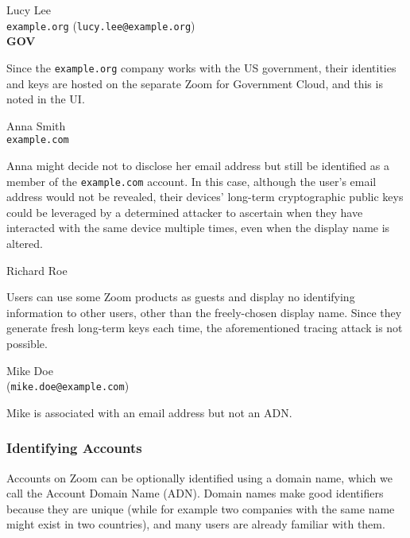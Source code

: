 \begin{multicols}{2}
Lucy Lee \\
\texttt{example.org} (\texttt{lucy.lee@example.org}) \\ \textbf{GOV}

\columnbreak

Since the \texttt{example.org} company works with the US government, their identities and keys are
hosted on the separate Zoom for Government Cloud, and this is noted in the UI.
\end{multicols}

\begin{multicols}{2}
Anna Smith \\
\texttt{example.com}

\columnbreak

Anna might decide not to disclose her email address but still be identified as a member of the
\texttt{example.com} account. In this case, although the user's email address would not be revealed,
their devices' long-term cryptographic public keys could be leveraged by a determined attacker to
ascertain when they have interacted with the same device multiple times, even when the display name
is altered.
\end{multicols}

\clearpage

\begin{multicols}{2}
Richard Roe

\columnbreak

Users can use some Zoom products as guests and display no identifying information to other users,
other than the freely-chosen display name. Since they generate fresh long-term keys each time, the
aforementioned tracing attack is not possible.
\end{multicols}

\begin{multicols}{2}
Mike Doe \\
(\texttt{mike.doe@example.com})

\columnbreak

Mike is associated with an email address but not an ADN.
\end{multicols}

\subsubsection{Identifying Accounts}\label{subsubsec:adn}

Accounts on Zoom can be optionally identified using a domain name, which we call the Account Domain
Name (ADN). Domain names make good identifiers because they are unique (while for example two
companies with the same name might exist in two countries), and many users are already familiar with
them.

